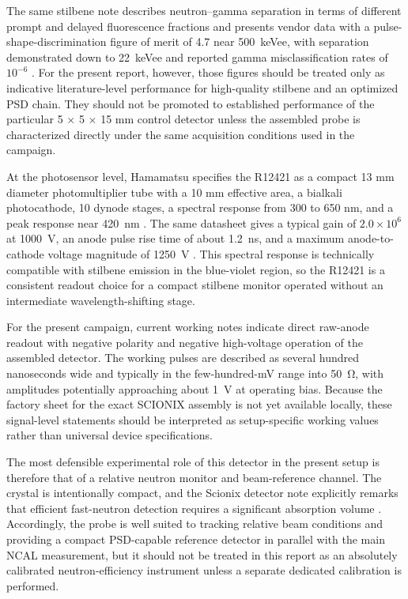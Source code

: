 The same stilbene note describes neutron--gamma separation in terms of different prompt and delayed fluorescence fractions and presents vendor data with a pulse-shape-discrimination figure of merit of 4.7 near \SI{500}{keVee}, with separation demonstrated down to \SI{22}{keVee} and reported gamma misclassification rates of $10^{-6}$ \citep{InradStilbeneNote}. For the present report, however, those figures should be treated only as indicative literature-level performance for high-quality stilbene and an optimized PSD chain. They should not be promoted to established performance of the particular 5 $\times$ 5 $\times$ 15 mm control detector unless the assembled probe is characterized directly under the same acquisition conditions used in the campaign.

At the photosensor level, Hamamatsu specifies the R12421 as a compact 13 mm diameter photomultiplier tube with a 10 mm effective area, a bialkali photocathode, 10 dynode stages, a spectral response from 300 to 650 nm, and a peak response near \SI{420}{nm} \citep{HamamatsuR12421Manual}. The same datasheet gives a typical gain of $2.0\times10^{6}$ at \SI{1000}{V}, an anode pulse rise time of about \SI{1.2}{ns}, and a maximum anode-to-cathode voltage magnitude of \SI{1250}{V} \citep{HamamatsuR12421Manual}. This spectral response is technically compatible with stilbene emission in the blue-violet region, so the R12421 is a consistent readout choice for a compact stilbene monitor operated without an intermediate wavelength-shifting stage.

For the present campaign, current working notes indicate direct raw-anode readout with negative polarity and negative high-voltage operation of the assembled detector. The working pulses are described as several hundred nanoseconds wide and typically in the few-hundred-mV range into \SI{50}{\ohm}, with amplitudes potentially approaching about \SI{1}{V} at operating bias. Because the factory sheet for the exact SCIONIX assembly is not yet available locally, these signal-level statements should be interpreted as setup-specific working values rather than universal device specifications.

The most defensible experimental role of this detector in the present setup is therefore that of a relative neutron monitor and beam-reference channel. The crystal is intentionally compact, and the Scionix detector note explicitly remarks that efficient fast-neutron detection requires a significant absorption volume \citep{ScionixNeutronScintillatorNote}. Accordingly, the probe is well suited to tracking relative beam conditions and providing a compact PSD-capable reference detector in parallel with the main NCAL measurement, but it should not be treated in this report as an absolutely calibrated neutron-efficiency instrument unless a separate dedicated calibration is performed.

